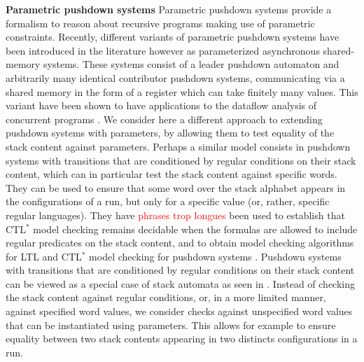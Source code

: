 \documentclass[a4paper,UKenglish,cleveref, autoref, thm-restate]{lipics-v2021}
\begin{document}
{\bf Parametric pushdown systems}
 Parametric pushdown systems provide a  formalism to
reason about 
recursive programs
making use of parametric constraints. 
Recently, different variants of parametric pushdown systems have been introduced in the literature 
\cite{hague2011parameterised, esparza2016parameterized, fortin2017model} 
however as
parameterized asynchronous shared-memory systems.
These systems consist of a leader pushdown automaton
and arbitrarily many identical contributor pushdown systems, communicating via a shared memory
in the form of a register which can take finitely many values.
This variant have been shown to have applications
to the dataflow analysis of concurrent programs \cite{kahlon2008parameterization}. 
We consider here a different approach to extending pushdown systems with parameters, by allowing them to test equality of the stack content against parameters.
Perhaps a similar model consists in 
pushdown systems 
with transitions that are conditioned by regular conditions on their stack content, which
can in particular
test the
stack content against
specific words. 
They can be used to ensure that some word over the stack alphabet appears in the configurations of a run, but only for a specific value (or, rather, specific regular languages).
They have \textcolor{red}{ phrases trop longues}
been used to establish that CTL$^*$ model checking remains decidable
when the formulas are allowed to include regular predicates on the stack content,
and to obtain 
model checking algorithms for LTL and CTL$^*$ model checking
for
pushdown systems \cite{finkel1997direct}.
Pushdown systems 
with transitions that are conditioned by regular conditions on their stack content
can be viewed as
a special case of stack automata as seen in \cite{hopcroft1969formal}.
Instead
of checking the stack content against regular conditions, or, in a more limited manner,
against specified word values,
we consider
checks against unspecified word values that can be instantiated using parameters.
This allows for example to ensure equality between two stack contents appearing in two distincts configurations in a run.
\end{document}
